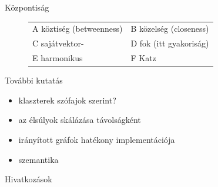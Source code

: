 \documentclass{beamer}
\newlength{\onecolwid}
\begin{document}
\begin{frame}[t]
\begin{columns}[t]
\begin{column}{\onecolwid}
\begin{block}{Központiság}
\begin{figure}
              \begin{tabular}{ll}
                \alert{A} köztiség (betweenness)	& \alert{B} közelség (closeness) \\
                \alert{C} sajátvektor-	& \alert{D} fok (itt gyakoriság)\\
                \alert{E} harmonikus	& \alert{F} Katz \\
              \end{tabular}
          \end{figure}
        \end{block}

        \bigskip

        \begin{block}{További kutatás}
          \begin{itemize}
            \item klaszterek szófajok szerint?
            \item az élsúlyok skálázása távolságként
            \item irányított gráfok hatékony implementációja
            \item szemantika
          \end{itemize}
        \end{block}

        \bigskip

        \begin{block}{Hivatkozások}
          \small
            
            
        \end{block}

      \end{column} 
  \end{columns}
\end{frame}
\end{document}
